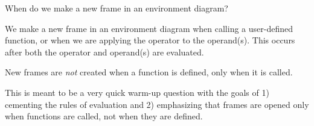 \begin{blocksection}
\question When do we make a new frame in an environment diagram?

\begin{solution}[0.5in]
We make a new frame in an environment diagram when calling a user-defined function, or when we are applying the operator to the operand(s). This occurs after both the operator and operand(s) are evaluated.

New frames are \textit{not} created when a function is defined, only when it is called. 
\end{solution}
\end{blocksection}

\begin{questionmeta}
    This is meant to be a very quick warm-up question with the goals of 1) cementing the rules of evaluation and 2) emphasizing that frames are opened only when functions are called, not when they are defined. 
\end{questionmeta}
